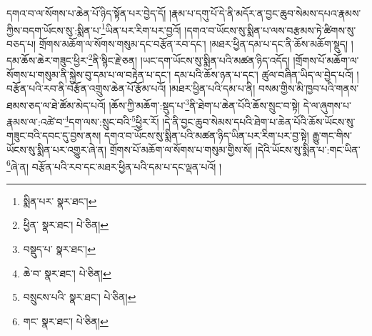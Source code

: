 དགའ་བ་ལ་སོགས་པ་ཆེན་པོ་ཉིད་སྟོན་པར་བྱེད་དོ། །རྣམ་པ་དགུ་པོ་དེ་ནི་མདོར་ན་བྱང་ཆུབ་སེམས་དཔའ་རྣམས་ཀྱིས་བདག་ཡོངས་སུ་:སྨིན་པ་\footnote{སྨིན་པར་  སྣར་ཐང་། }ཡིན་པར་རིག་པར་བྱའོ། །དགའ་བ་ཡོངས་སུ་སྨིན་པ་ལས་བརྩམས་ཏེ་ཚིགས་སུ་བཅད་པ། གྲོགས་མཆོག་ལ་སོགས་གསུམ་དང་བརྩོན་རབ་དང་། །མཐར་ཕྱིན་དམ་པ་དང་ནི་ཆོས་མཆོག་སྡུད། །དམ་ཆོས་ཆེར་གཟུང་ཕྱིར་\footnote{ཕྱིན་  སྣར་ཐང་།  པེ་ཅིན། }ནི་སྙིང་རྗེ་ཅན། །ཡང་དག་ཡོངས་སུ་སྨིན་པའི་མཚན་ཉིད་འདོད། །གྲོགས་པོ་མཆོག་ལ་སོགས་པ་གསུམ་ནི་སྐྱེས་བུ་དམ་པ་ལ་བརྟེན་པ་དང་། དམ་པའི་ཆོས་ཉན་པ་དང་། ཚུལ་བཞིན་ཡིད་ལ་བྱེད་པའོ། །བརྩོན་པའི་རབ་ནི་བརྩོན་འགྲུས་ཆེན་པོ་རྩོམ་པའོ། །མཐར་ཕྱིན་པའི་དམ་པ་ནི། བསམ་གྱིས་མི་ཁྱབ་པའི་གནས་ཐམས་ཅད་ལ་ཐེ་ཚོམ་མེད་པའོ། །ཆོས་ཀྱི་མཆོག་:སྡུད་པ་\footnote{བསྡུད་པ་  སྣར་ཐང་། }ནི་ཐེག་པ་ཆེན་པོའི་ཆོས་སྲུང་བ་སྟེ། དེ་ལ་ཞུགས་པ་རྣམས་ལ་:འཚེ་བ་\footnote{ཆེ་བ་  སྣར་ཐང་།  པེ་ཅིན། }དག་ལས་:སྲུང་བའི་\footnote{བསྲུངས་པའི་  སྣར་ཐང་།  པེ་ཅིན། }ཕྱིར་རོ། །དེ་ནི་བྱང་ཆུབ་སེམས་དཔའི་ཐེག་པ་ཆེན་པོའི་ཆོས་ཡོངས་སུ་གཟུང་བའི་དབང་དུ་བྱས་ནས། དགའ་བ་ཡོངས་སུ་སྨིན་པའི་མཚན་ཉིད་ཡིན་པར་རིག་པར་བྱ་སྟེ། རྒྱུ་གང་གིས་ཡོངས་སུ་སྨིན་པར་འགྱུར་ཞེ་ན། གྲོགས་པོ་མཆོག་ལ་སོགས་པ་གསུམ་གྱིས་སོ། །དེའི་ཡོངས་སུ་སྨིན་པ་:གང་ཡིན་\footnote{གང་  སྣར་ཐང་།  པེ་ཅིན། }ཞེ་ན། བརྩོན་པའི་རབ་དང་མཐར་ཕྱིན་པའི་དམ་པ་དང་ལྡན་པའོ། །

